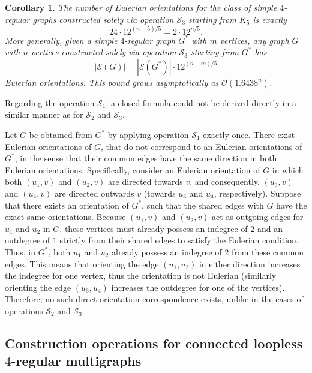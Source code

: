 \documentclass{article}
\newtheorem{corollary}{Corollary}
\begin{document}
        \begin{corollary}
            The number of Eulerian orientations for the class of simple $4$-regular graphs constructed solely via operation $\mathcal{S}_3$ starting from $K_5$ is exactly
            $$24\cdot 12^{(n-5)/5} = 2 \cdot 12^{n/5}.$$
            More generally, given a simple $4$-regular graph $G^*$ with $m$ vertices, any graph $G$ with $n$ vertices constructed solely via operation $\mathcal{S}_3$ starting from $G^*$ has 
            $$|\mathcal{E}(G)| = |\mathcal{E}(G^*)| \cdot 12^{(n-m)/5}$$
            Eulerian orientations.
            This bound grows asymptotically as $\mathcal{O} \left(1.6438^n \right)$.
        \end{corollary}
        
        Regarding the operation $\mathcal{S}_1$, a closed formula could not be derived directly in a similar manner as for $\mathcal{S}_2$ and $\mathcal{S}_3$. 
        
        Let $G$ be obtained from $G^*$ by applying operation $\mathcal{S}_1$ exactly once. 
        There exist Eulerian orientations of $G$, that do not correspond to an Eulerian orientations of $G^*$, in the sense that their common edges have the same direction in both Eulerian orientations.
        Specifically, consider an Eulerian orientation of $G$ in which both $(u_1,v)$ and $(u_2,v)$ are directed towards $v$, and consequently, $(u_3,v)$ and $(u_4,v)$ are directed outwards $v$ (towards $u_3$ and $u_4$, respectively). 
        Suppose that there exists an orientation of $G^*$, such that the shared edges with $G$ have the exact same orientations.
        Because $(u_1,v)$ and $(u_2,v)$ act as outgoing edges for $u_1$ and $u_2$ in $G$, these vertices must already possess an indegree of $2$ and an outdegree of $1$ strictly from their shared edges to satisfy the Eulerian condition. 
        Thus, in $G^*$, both $u_1$ and $u_2$ already possess an indegree of $2$ from these common edges. 
        This means that orienting the edge $(u_1, u_2)$ in either direction increases the indegree for one vertex, thus the orientation is not Eulerian (similarly orienting the edge $(u_3, u_4)$ increases the outdegree for one of the vertices).
        Therefore, no such direct orientation correspondence exists, unlike in the cases of operations $\mathcal{S}_2$ and $\mathcal{S}_3$.

    \subsection{Construction operations for connected loopless \texorpdfstring{$4$}{4}-regular multigraphs}
    
\end{document}
